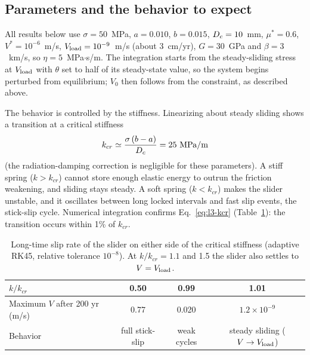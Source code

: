 
\subsection{Parameters and the behavior to expect}

All results below use $\sigma=50$~MPa, $a=0.010$, $b=0.015$, $D_c=10$~mm, $\mu^*=0.6$, $V^*=10^{-6}$~m/s, $V_{\mathrm{load}}=10^{-9}$~m/s (about 3~cm/yr), $G=30$~GPa and $\beta=3$~km/s, so $\eta=5$~MPa$\cdot$s/m. The integration starts from the steady-sliding stress at $V_{\mathrm{load}}$ with $\theta$ set to half of its steady-state value, so the system begins perturbed from equilibrium; $V_0$ then follows from the constraint, as described above.

The behavior is controlled by the stiffness. Linearizing about steady sliding shows a transition at a critical stiffness
\begin{equation}
k_{cr}\simeq\frac{\sigma\,(b-a)}{\Dc}=25\ \text{MPa/m}
\label{eq:l3-kcr}
\end{equation}
(the radiation-damping correction is negligible for these parameters). A stiff spring ($k>k_{cr}$) cannot store enough elastic energy to outrun the friction weakening, and sliding stays steady. A soft spring ($k<k_{cr}$) makes the slider unstable, and it oscillates between long locked intervals and fast slip events, the stick-slip cycle. Numerical integration confirms Eq.~\eqref{eq:l3-kcr} (Table~\ref{tab:l3-kcr}): the transition occurs within 1\% of $k_{cr}$.

\begin{table}[ht]
\centering
\small
\begin{tabular}{lccc}
\toprule
$k/k_{cr}$ & 0.50 & 0.99 & 1.01 \\
\midrule
Maximum $V$ after 200 yr (m/s) & 0.77 & 0.020 & $1.2\times10^{-9}$ \\
Behavior & full stick-slip & weak cycles & steady sliding ($V\to V_{\mathrm{load}}$) \\
\bottomrule
\end{tabular}
\caption{Long-time slip rate of the slider on either side of the critical stiffness (adaptive RK45, relative tolerance $10^{-8}$). At $k/k_{cr}=1.1$ and 1.5 the slider also settles to $V=V_{\mathrm{load}}$.}
\label{tab:l3-kcr}
\end{table}

